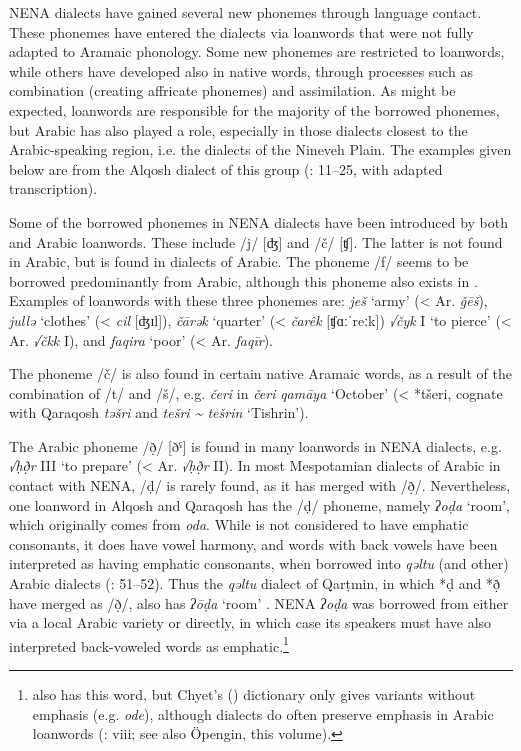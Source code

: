\documentclass[output=paper]{langsci/langscibook}
\begin{document}
NENA dialects have gained several new phonemes through language contact. These phonemes have entered the dialects via {loanwords} that were not fully adapted to Aramaic phonology. Some new phonemes are restricted to {loanwords}, while others have developed also in native words, through processes such as combination (creating affricate phonemes) and assimilation. As might be expected,  {loanwords} are responsible for the majority of the borrowed phonemes, but Arabic has also played a role, especially in those dialects closest to the Arabic-speaking region, i.e. the  dialects of the Nineveh Plain. The examples given below are from the  Alqosh dialect of this group (\citealt{Coghill2004}: 11–25, with adapted transcription).

Some of the borrowed phonemes in NENA dialects have been introduced by both  and Arabic {loanwords}. These include /j/ [ʤ] and /č/ [ʧ]. The latter is not found in  Arabic, but is found in  dialects of Arabic. The {phoneme} /f/ seems to be borrowed predominantly from Arabic, although this {phoneme} also exists in . Examples of {loanwords} with these three phonemes are: \textit{ješ} ‘army’ (<  Ar. \textit{ǧēš}), \textit{jullə} ‘clothes’ (<  \textit{cil} [ʤɪl]), \textit{čārək} ‘quarter’ (<  \textit{čarêk} [ʧɑːˈreːk]) \textit{√čyk} I ‘to pierce’ (<  Ar. \textit{√čkk} I), and \textit{faqira} ‘poor’ (< Ar. \textit{faqīr}).

The {phoneme} /č/ is also found in certain native Aramaic words, as a result of the combination of /t/ and /š/, e.g. \textit{čeri} in \textit{čeri} \textit{qamāya} ‘October’ (< *tšeri, {cognate} with  Qaraqosh \textit{təšri} and  \textit{tešri {\textasciitilde} tešrin} ‘Tishrin’).

The Arabic {phoneme} /ð̣/ [ðˤ] is found in many {loanwords} in  NENA dialects, e.g. \textit{√ḥð̣r} III ‘to prepare’ (<  Ar. \textit{√ḥð̣r} II). In most Mespotamian dialects of Arabic in contact with NENA, /ḍ/ is rarely found, as it has {merged} with /ð̣/. Nevertheless, one {loanword} in Alqosh and Qaraqosh has the /ḍ/ {phoneme}, namely \textit{ʔoḍa} ‘room’, which originally comes from  \textit{oda}. While  is not considered to have {emphatic consonants}, it does have vowel harmony, and words with back vowels have been interpreted as having {emphatic consonants}, when borrowed into \textit{qəltu} (and other) Arabic dialects (\citealt{Jastrow1978}: 51–52). Thus the \textit{qəltu} dialect of Qarṭmin, in which *ḍ and *ð̣ have {merged} as /ð̣/, also has \textit{ʔōḍa} ‘room’ \citep[70]{Jastrow1978}. NENA \textit{ʔoḍa} was borrowed from  either via a local Arabic variety or directly, in which case its speakers must have also interpreted back-voweled  words as {emphatic}.\footnote{ also has this word, but Chyet's (\citeyear{Chyet2003}) dictionary only gives variants without {emphasis} (e.g. \textit{ode}), although   dialects do often preserve {emphasis} in Arabic {loanwords} (\citealt{Chyet2003}: viii; see also Öpengin, this volume).}
\end{document}
